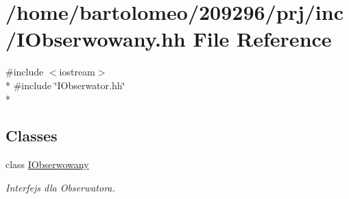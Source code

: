 \hypertarget{_i_obserwowany_8hh}{\section{/home/bartolomeo/209296/prj/inc/\-I\-Obserwowany.hh File Reference}
\label{_i_obserwowany_8hh}
}
{\ttfamily \#include $<$iostream$>$}\\*
{\ttfamily \#include \char`\"{}I\-Obserwator.\-hh\char`\"{}}\\*
\subsection*{Classes}
\begin{DoxyCompactItemize}
\item 
class \hyperlink{class_i_obserwowany}{I\-Obserwowany}
\begin{DoxyCompactList}\small\item\em Interfejs dla Obserwatora. \end{DoxyCompactList}\end{DoxyCompactItemize}
